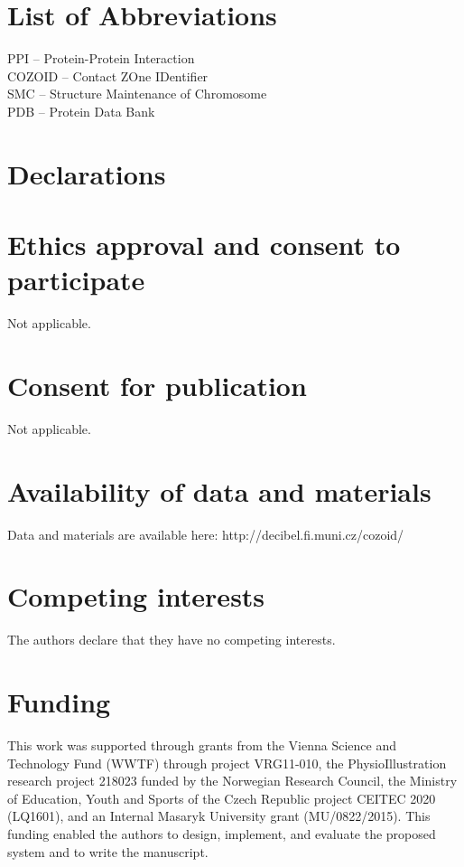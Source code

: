 \documentclass[twocolumn]{bmcart}%
\begin{document}
\section*{List of Abbreviations}
\begin{backmatter}
PPI -- Protein-Protein Interaction \\
COZOID -- Contact ZOne IDentifier \\
SMC -- Structure Maintenance of Chromosome \\
PDB -- Protein Data Bank \\
\end{backmatter}

\section*{Declarations}
\begin{backmatter}

\section*{Ethics approval and consent to participate}
Not applicable.

\section*{Consent for publication}
Not applicable.

\section*{Availability of data and materials}
Data and materials are available here: http://decibel.fi.muni.cz/cozoid/

\section*{Competing interests}
  The authors declare that they have no competing interests.
	
\section*{Funding}
This work was supported through grants from the Vienna Science and Technology Fund (WWTF) through project VRG11-010, the PhysioIllustration research project 218023 funded by the Norwegian Research Council, the Ministry of Education, Youth and Sports of the Czech Republic project CEITEC 2020 (LQ1601), and an Internal Masaryk University grant (MU/0822/2015). This funding enabled the authors to design, implement, and evaluate the proposed system and to write the manuscript.


\end{backmatter}
\end{document}
